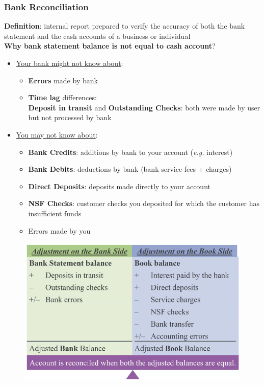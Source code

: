 \documentclass{article}
\newcommand{\eg}[0]{\textit{e.g. }}
\begin{document}
\begin{multicols}{2}
\subsubsection{Bank Reconciliation}
\textbf{Definition}: internal report prepared to verify the accuracy of both the bank statement and the cash accounts of a business or individual\\
\textbf{Why bank statement balance is not equal to cash account}?
\begin{itemize}
	\item \underline{Your bank might not know about}:
	\begin{itemize}
		\item \textbf{Errors} made by bank
		\item \textbf{Time lag} differences:\\
		\textbf{Deposit in transit} and \textbf{Outstanding Checks}: both were made by user but not processed by bank
	\end{itemize}
    \item \underline{You may not know about}:
    \begin{itemize}
    	\item \textbf{Bank Credits}: additions by bank to your account (\eg interest)
    	\item \textbf{Bank Debits}: deductions by bank (bank service fees + charges)
    	\item \textbf{Direct Deposits}: deposits made directly to your account
    	\item \textbf{NSF Checks}: customer checks you deposited for which the customer has insufficient funds
    	\item Errors made by you
    \end{itemize}
\end{itemize}
\begin{figure}[H]
	\centering
	\includegraphics[width=\columnwidth]{image/bank_reconciliation.png}
\end{figure}

\end{multicols}
\end{document}
